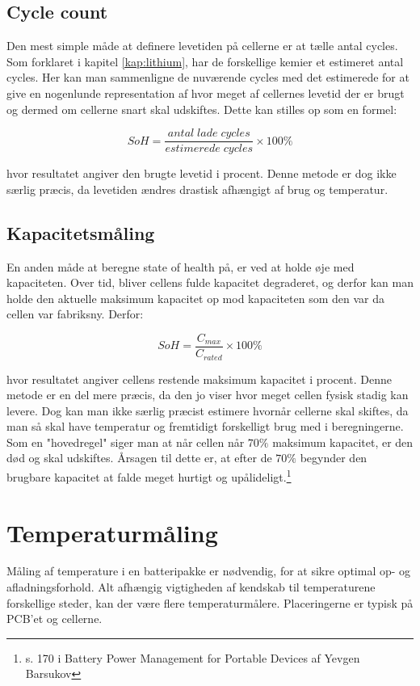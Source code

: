 \subsection{Cycle count}
Den mest simple måde at definere levetiden på cellerne er at tælle antal cycles. Som forklaret i kapitel \ref{kap:lithium}, har de forskellige kemier et estimeret antal cycles. Her kan man sammenligne de nuværende cycles med det estimerede for at give en nogenlunde representation af hvor meget af cellernes levetid der er brugt og dermed om cellerne snart skal udskiftes. Dette kan stilles op som en formel: 

\begin {equation} 
SoH = \frac{antal \; lade \; cycles}{estimerede \; cycles}\times 100\percent \label{eq:soh_cycles}
\end {equation}

hvor resultatet angiver den brugte levetid i procent. Denne metode er dog ikke særlig præcis, da levetiden ændres drastisk afhængigt af brug og temperatur. 

\subsection{Kapacitetsmåling}
En anden måde at beregne state of health på, er ved at holde øje med kapaciteten. Over tid, bliver cellens fulde kapacitet degraderet, og derfor kan man holde den aktuelle maksimum kapacitet op mod kapaciteten som den var da cellen var fabriksny. Derfor: 

\begin {equation} 
SoH = \frac{C_{max}}{C_{rated}}\times 100\percent \label{eq:soh_capacity}
\end {equation}

hvor resultatet angiver cellens restende maksimum kapacitet i procent. Denne metode er en del mere præcis, da den jo viser hvor meget cellen fysisk stadig kan levere. Dog kan man ikke særlig præcist estimere hvornår cellerne skal skiftes, da man så skal have temperatur og fremtidigt forskelligt brug med i beregningerne.\\ 

Som en "hovedregel" \space siger man at når cellen når $70\percent$ maksimum kapacitet, er den død og skal udskiftes. Årsagen til dette er, at efter de $70\percent$ begynder den brugbare kapacitet at falde meget hurtigt og upålideligt.\footnote{s. 170 i Battery Power Management for Portable Devices af Yevgen Barsukov}

\section{Temperaturmåling}
Måling af temperature i en batteripakke er nødvendig, for at sikre optimal op- og afladningsforhold. Alt afhængig vigtigheden af kendskab til temperaturene forskellige steder, kan der være flere temperaturmålere. Placeringerne er typisk på PCB'et og cellerne.
\\

